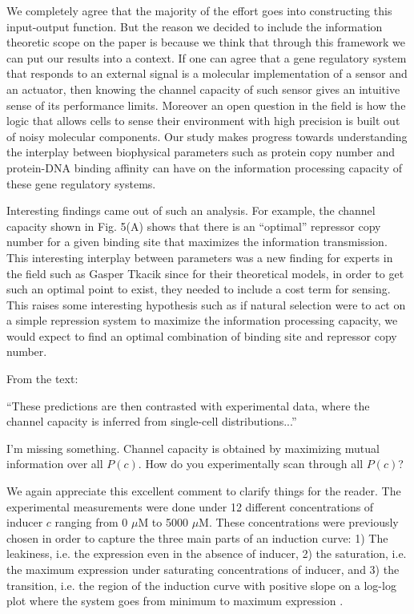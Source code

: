 We completely agree that the majority of the effort goes into constructing this
input-output function. But the reason we decided to include the information
theoretic scope on the paper is because we think that through this framework we
can put our results into a context. If one can agree that a gene regulatory
system that responds to an external signal is a molecular implementation of a
sensor and an actuator, then knowing the channel capacity of such sensor gives
an intuitive sense of its performance limits. Moreover an open question in the
field is how the logic that allows cells to sense their environment with high
precision is built out of noisy molecular components. Our study makes progress
towards understanding the interplay between biophysical parameters such as
protein copy number and protein-DNA binding affinity can have on the information
processing capacity of these gene regulatory systems.

Interesting findings came out of such an analysis. For example, the channel
capacity shown in Fig. 5(A) shows that there is an ``optimal'' repressor copy
number for a given binding site that maximizes the information transmission.
This interesting interplay between parameters was a new finding for experts in
the field such as Gasper Tkacik since for their theoretical models, in order to
get such an optimal point to exist, they needed to include a cost term for
sensing. This raises some interesting hypothesis such as if natural selection
were to act on a simple repression system to maximize the information processing
capacity, we would expect to find an optimal combination of binding site and
repressor copy number.

\begin{tcolorbox}
  From the text:

``These predictions are then contrasted with experimental data, where the
channel capacity is inferred from single-cell distributions...''

I'm missing something. Channel capacity is obtained by maximizing mutual
information over all $P(c)$. How do you experimentally scan through all $P(c)$?
\end{tcolorbox}

We again appreciate this excellent comment to clarify things for the reader. The
experimental measurements were done under 12 different concentrations of inducer
$c$ ranging from 0 $\mu$M to 5000 $\mu$M. These concentrations were previously
chosen in order to capture the three main parts of an induction curve: 1) The
leakiness, i.e. the expression even in the absence of inducer, 2) the
saturation, i.e. the maximum expression under saturating concentrations of
inducer, and 3) the transition, i.e. the region of the induction curve with
positive slope on a log-log plot where the system goes from minimum to maximum
expression \cite{Razo-Mejia2018}.

